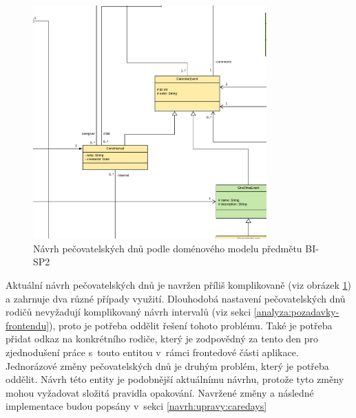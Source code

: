         \begin{figure}\centering
            \includegraphics[width=0.8\textwidth]{pdfs/CareDays1}
            \caption[Současný návrh pečovatelských dnů]{Návrh pečovatelských dnů podle doménového modelu předmětu BI-SP2}\label{image:caredays1}
        \end{figure}
        Aktuální návrh pečovatelských dnů je navržen příliš komplikovaně (viz obrázek \ref{image:caredays1}) a zahrnuje dva různé případy využití. Dlouhodobá nastavení pečovatelských dnů rodičů nevyžadují komplikovaný návrh intervalů (viz sekci \ref{analyza:pozadavky-frontendu}), proto je potřeba oddělit řešení tohoto problému. Také je potřeba přidat odkaz na konkrétního rodiče, který je zodpovědný za tento den pro zjednodušení práce s~touto entitou v~rámci frontedové části aplikace. Jednorázové změny pečovatelských dnů je druhým problém, který je potřeba oddělit. Návrh této entity je podobnější aktuálnímu návrhu, protože tyto změny mohou vyžadovat složitá pravidla opakování. Navržené změny a následné implementace budou popsány v~sekci \ref{navrh:upravy:caredays}
        
